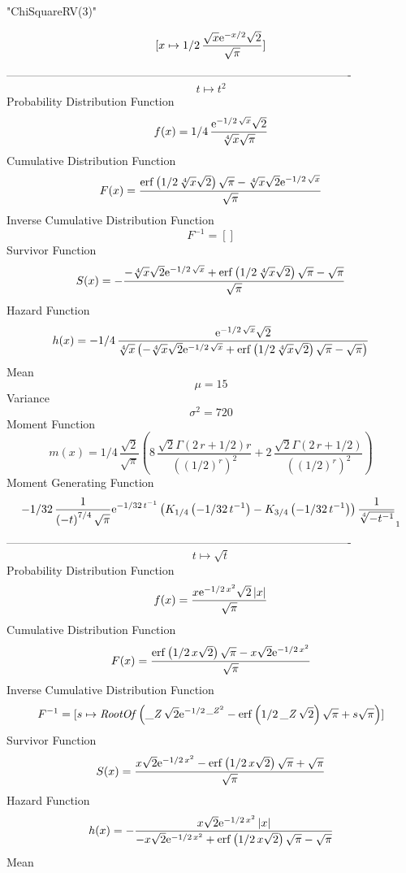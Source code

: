 \documentclass[12pt]{article}
\begin{document}
 
                              "ChiSquareRV(3)"

$$[x\mapsto 1/2\,{\frac {\sqrt {x}{{\rm e}^{-x/2}}\sqrt {2}}{\sqrt {\pi}
}}]
$$-------------------------------------------------------------------------------------------  \\$$t\mapsto {t}^{2}
$$Probability Distribution Function 
$$  f(x)=1/4\,{\frac {{{\rm e}^{-1/2\,\sqrt {x}}}\sqrt {2}}{\sqrt [4]{x}\sqrt {
\pi}}}
$$Cumulative Distribution Function  
 $$F(x)={\frac {{\rm erf} \left(1/2\,\sqrt [4]{x}\sqrt {2}\right)\sqrt {\pi}-
\sqrt [4]{x}\sqrt {2}{{\rm e}^{-1/2\,\sqrt {x}}}}{\sqrt {\pi}}}
$$ Inverse Cumulative Distribution Function 
  $$F^{-1} = []
$$Survivor Function 
 $$ S(x)=-{\frac {-\sqrt [4]{x}\sqrt {2}{{\rm e}^{-1/2\,\sqrt {x}}}+{\rm erf} 
\left(1/2\,\sqrt [4]{x}\sqrt {2}\right)\sqrt {\pi}-\sqrt {\pi}}{\sqrt 
{\pi}}}
$$ Hazard Function 
 $$ h(x)=-1/4\,{\frac {{{\rm e}^{-1/2\,\sqrt {x}}}\sqrt {2}}{\sqrt [4]{x}
 \left( -\sqrt [4]{x}\sqrt {2}{{\rm e}^{-1/2\,\sqrt {x}}}+{\rm erf} 
\left(1/2\,\sqrt [4]{x}\sqrt {2}\right)\sqrt {\pi}-\sqrt {\pi}
 \right) }}
$$Mean 
 $$ \mu=15
$$ Variance 
 $$ \sigma^2 = 720
$$Moment Function 
 $$ m(x) = 1/4\,{\frac {\sqrt {2}}{\sqrt {\pi}} \left( 8\,{\frac {\sqrt {2}\Gamma
 \left( 2\,r+1/2 \right) r}{ \left(  \left( 1/2 \right) ^{r} \right) ^
{2}}}+2\,{\frac {\sqrt {2}\Gamma \left( 2\,r+1/2 \right) }{ \left( 
 \left( 1/2 \right) ^{r} \right) ^{2}}} \right) }
$$ Moment Generating Function 
 $$-1/32\,{\frac {1}{ \left( -t \right) ^{7/4}\sqrt {\pi}}{{\rm e}^{-1/32
\,{t}^{-1}}} \left( {{\sl K}_{1/4}\left(-1/32\,{t}^{-1}\right)}-{
{\sl K}_{3/4}\left(-1/32\,{t}^{-1}\right)} \right) {\frac {1}{\sqrt [4
]{-{t}^{-1}}}}}_{{1}}
$$-------------------------------------------------------------------------------------------  \\$$t\mapsto \sqrt {t}
$$Probability Distribution Function 
$$  f(x)={\frac {x{{\rm e}^{-1/2\,{x}^{2}}}\sqrt {2} \left| x \right| }{\sqrt {
\pi}}}
$$Cumulative Distribution Function  
 $$F(x)={\frac {{\rm erf} \left(1/2\,x\sqrt {2}\right)\sqrt {\pi}-x\sqrt {2}{
{\rm e}^{-1/2\,{x}^{2}}}}{\sqrt {\pi}}}
$$ Inverse Cumulative Distribution Function 
  $$F^{-1} = [s\mapsto {\it RootOf} \left( {\it \_Z}\,\sqrt {2}{{\rm e}^{-1/2\,{{
\it \_Z}}^{2}}}-{\rm erf} \left(1/2\,{\it \_Z}\,\sqrt {2}\right)\sqrt 
{\pi}+s\sqrt {\pi} \right) ]
$$Survivor Function 
 $$ S(x)={\frac {x\sqrt {2}{{\rm e}^{-1/2\,{x}^{2}}}-{\rm erf} \left(1/2\,x
\sqrt {2}\right)\sqrt {\pi}+\sqrt {\pi}}{\sqrt {\pi}}}
$$ Hazard Function 
 $$ h(x)=-{\frac {x\sqrt {2}{{\rm e}^{-1/2\,{x}^{2}}} \left| x \right| }{-x
\sqrt {2}{{\rm e}^{-1/2\,{x}^{2}}}+{\rm erf} \left(1/2\,x\sqrt {2}
\right)\sqrt {\pi}-\sqrt {\pi}}}
$$Mean 
\end{document}
